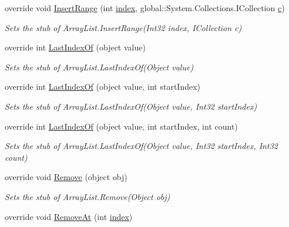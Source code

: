 \begin{DoxyCompactItemize}
override void \hyperlink{class_system_1_1_collections_1_1_fakes_1_1_stub_array_list_aa60f8846238cb6aa96e8ff1d7c0b6a05}{Insert\-Range} (int \hyperlink{jquery-1_810_82-vsdoc_8js_a75bb12d1f23302a9eea93a6d89d0193e}{index}, global\-::\-System.\-Collections.\-I\-Collection \hyperlink{bootstrap_8min_8js_abce695e0af988ece0826d9ad59b8160d}{c})
\begin{DoxyCompactList}\small\item\em Sets the stub of Array\-List.\-Insert\-Range(\-Int32 index, I\-Collection c)\end{DoxyCompactList}\item 
override int \hyperlink{class_system_1_1_collections_1_1_fakes_1_1_stub_array_list_a2f3fea408f272b3aced35ca4e88e3f0a}{Last\-Index\-Of} (object value)
\begin{DoxyCompactList}\small\item\em Sets the stub of Array\-List.\-Last\-Index\-Of(\-Object value)\end{DoxyCompactList}\item 
override int \hyperlink{class_system_1_1_collections_1_1_fakes_1_1_stub_array_list_a184e209e3c636b2ec40b00737677a11f}{Last\-Index\-Of} (object value, int start\-Index)
\begin{DoxyCompactList}\small\item\em Sets the stub of Array\-List.\-Last\-Index\-Of(\-Object value, Int32 start\-Index)\end{DoxyCompactList}\item 
override int \hyperlink{class_system_1_1_collections_1_1_fakes_1_1_stub_array_list_a03968edc12f5978bf37ab331158772ca}{Last\-Index\-Of} (object value, int start\-Index, int count)
\begin{DoxyCompactList}\small\item\em Sets the stub of Array\-List.\-Last\-Index\-Of(\-Object value, Int32 start\-Index, Int32 count)\end{DoxyCompactList}\item 
override void \hyperlink{class_system_1_1_collections_1_1_fakes_1_1_stub_array_list_a02723fa120a9f1754f9637abbc45d0a4}{Remove} (object obj)
\begin{DoxyCompactList}\small\item\em Sets the stub of Array\-List.\-Remove(\-Object obj)\end{DoxyCompactList}\item 
override void \hyperlink{class_system_1_1_collections_1_1_fakes_1_1_stub_array_list_ab544c445631a0b59b01063a8ce0c73dd}{Remove\-At} (int \hyperlink{jquery-1_810_82-vsdoc_8js_a75bb12d1f23302a9eea93a6d89d0193e}{index})

\end{DoxyCompactItemize}
